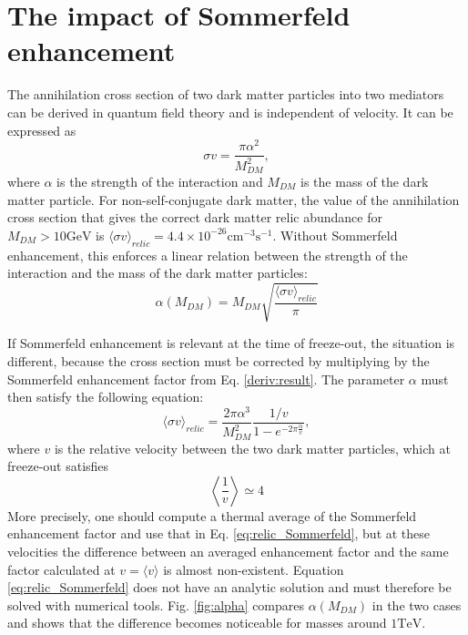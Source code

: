 \section{The impact of Sommerfeld enhancement}
The annihilation cross section of two dark matter particles into two mediators can be derived in quantum field theory and is independent of velocity. It can be expressed as
\begin{equation}
	\sigma v = \frac{\pi \alpha^2}{M_{DM}^2},
\end{equation}
where \(\alpha\) is the strength of the interaction and \(M_{DM} \) is the mass of the dark matter particle. For non-self-conjugate dark matter, the value of the annihilation cross section that gives the correct dark matter relic abundance for \(M_{DM} > 10 \mathrm{GeV} \) is \(\langle \sigma v \rangle _{relic}  = 4.4 \times 10^{-26} \mathrm{cm^{-3} s^{-1}}\). Without Sommerfeld enhancement, this enforces a linear relation between the strength of the interaction and the mass of the dark matter particles:
\begin{equation}
	\alpha(M_{DM} ) = M_{DM} \sqrt{\frac{\langle \sigma v \rangle _{relic}}{\pi}}
\end{equation}

If Sommerfeld enhancement is relevant at the time of freeze-out, the situation is different, because the cross section must be corrected by multiplying by the Sommerfeld enhancement factor from Eq. \eqref{deriv:result}. The parameter \(\alpha \) must then satisfy the following equation:
\begin{equation}\label{eq:relic_Sommerfeld}
	\langle \sigma v \rangle _{relic} = \frac{2\pi \alpha ^3}{M_{DM} ^2} \frac{1 / v}{1- e^{-2\pi \frac{\alpha}{v}}},
\end{equation}
where \(v\) is the relative velocity between the two dark matter particles, which at freeze-out satisfies
\begin{equation}
	\left \langle \frac{1}{v} \right \rangle \simeq 4
\end{equation}
More precisely, one should compute a thermal average of the Sommerfeld enhancement factor and use that in Eq. \eqref{eq:relic_Sommerfeld}, but at these velocities the difference between an averaged enhancement factor and the same factor calculated at \(v= \langle v \rangle \) is almost non-existent. Equation \eqref{eq:relic_Sommerfeld} does not have an analytic solution and must therefore be solved with numerical tools. Fig. \ref{fig:alpha} compares \(\alpha (M_{DM} )\) in the two cases and shows that the difference becomes noticeable for masses around \(1 \mathrm{TeV} \).

